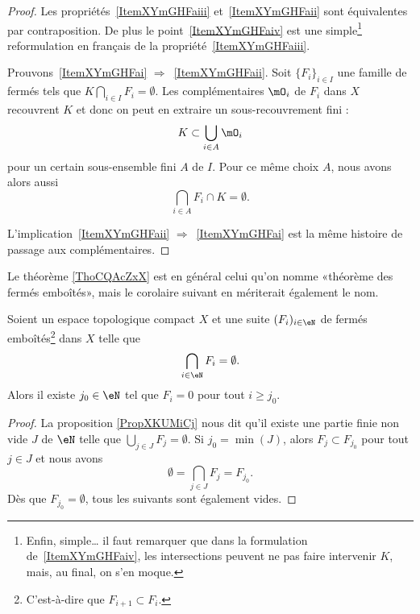 \begin{proof}
    Les propriétés~\ref{ItemXYmGHFaiii} et~\ref{ItemXYmGHFaii} sont équivalentes par contraposition. De plus le point~\ref{ItemXYmGHFaiv} est une simple\footnote{Enfin, simple\dots{} il faut remarquer que dans la formulation de~\ref{ItemXYmGHFaiv}, les intersections peuvent ne pas faire intervenir \( K \), mais, au final, on s'en moque.} reformulation en français de la propriété~\ref{ItemXYmGHFaiii}.

    Prouvons~\ref{ItemXYmGHFai} \( \Rightarrow\)~\ref{ItemXYmGHFaii}. Soit \( \{ F_i \}_{i\in I}\) une famille de fermés tels que \( K\bigcap_{i\in I}F_i=\emptyset\). Les complémentaires \( \mO_i\) de \( F_i\) dans \( X\) recouvrent \( K\) et donc on peut en extraire un sous-recouvrement fini :
    \begin{equation}
        K\subset\bigcup_{i\in A}\mO_i
    \end{equation}
    pour un certain sous-ensemble fini \( A\) de \( I\). Pour ce même choix \( A\), nous avons alors aussi
    \begin{equation}
        \bigcap_{i\in A}F_i \cap K =\emptyset.
    \end{equation}

    L'implication~\ref{ItemXYmGHFaii} \( \Rightarrow\)~\ref{ItemXYmGHFai} est la même histoire de passage aux complémentaires.
\end{proof}

Le théorème \ref{ThoCQAcZxX} est en général celui qu'on nomme «théorème des fermés emboîtés», mais le corolaire suivant en mériterait également le nom.
\begin{corollary}       \label{CORooQABLooMPSUBf}
    Soient un espace topologique compact \( X\) et une suite \( (F_i)_{i\in \eN}\) de fermés emboîtés\footnote{C'est-à-dire que \( F_{i+1}\subset F_i\).} dans \( X\) telle que
    \begin{equation}
        \bigcap_{i\in \eN}F_i=\emptyset.
    \end{equation}
    Alors il existe \( j_0\in \eN\) tel que \( F_i=0\) pour tout \( i\geq j_0\).
\end{corollary}

\begin{proof}
    La proposition \ref{PropXKUMiCj} nous dit qu'il existe une partie finie non vide \( J\) de \( \eN\) telle que \( \bigcup_{j\in J}F_j=\emptyset\). Si \( j_0=\min(J)\), alors \( F_j\subset F_{j_0}\) pour tout \( j\in J\) et nous avons
    \begin{equation}
        \emptyset=\bigcap_{j\in J}F_j=F_{j_0}.
    \end{equation}
    Dès que \( F_{j_0}=\emptyset\), tous les suivants sont également vides.
\end{proof}


